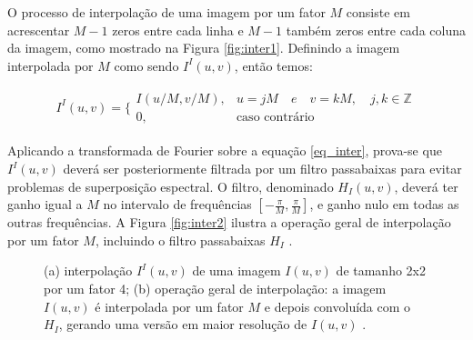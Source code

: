    O processo de interpolação de uma imagem por um fator $M$ consiste em acrescentar $M-1$ zeros entre cada linha e $M-1$ também zeros entre cada coluna da imagem, como mostrado na Figura \ref{fig:inter1}. Definindo a imagem interpolada por $M$ como sendo $I^I(u,v)$, então temos:

\begin{equation}
\begin{matrix}
	I^I(u,v)=\Bigg\{
	\begin{matrix}
		I(u/M,v/M), & u = jM \quad e \quad v = kM, \quad j,k \in  \mathbb{Z}\\ 
		0, &  \textrm{caso contrário}
	\end{matrix}
\end{matrix}
\label{eq_inter}
\end{equation}


Aplicando a transformada de Fourier sobre a equação \ref{eq_inter}, prova-se que $I^I(u,v)$ deverá ser posteriormente filtrada por um filtro passabaixas para evitar problemas de superposição espectral. O filtro, denominado $H_I(u,v)$, deverá ter ganho igual a $M$ no intervalo de frequências $\left[-\frac{\pi}{M},\frac{\pi}{M} \right]$, e ganho nulo em todas as outras frequências. A Figura \ref{fig:inter2} ilustra a operação geral de interpolação por um fator $M$, incluindo o filtro passabaixas $H_I$ \cite{garcia2013tecnicas}. 


\begin{figure}[h]
    \centering
    \qquad
    \caption{(a) interpolação $I^I(u,v)$ de uma imagem $I(u,v)$ de tamanho 2x2 por um fator 4; (b) operação geral de interpolação: a imagem $I(u,v)$ é interpolada por um fator $M$ e depois convoluída com o $H_I$, gerando uma versão em maior resolução de $I(u,v)$ \cite{garcia2013tecnicas}. }%
	    
\end{figure}


